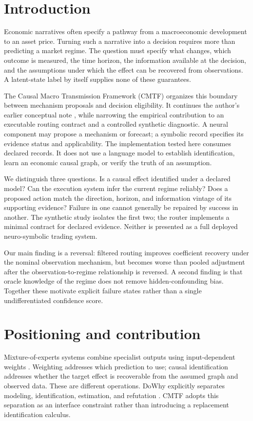 \section{Introduction}
Economic narratives often specify a pathway from a macroeconomic development to an asset price. Turning such a narrative into a decision requires more than predicting a market regime. The question must specify what changes, which outcome is measured, the time horizon, the information available at the decision, and the assumptions under which the effect can be recovered from observations. A latent-state label by itself supplies none of these guarantees.

The Causal Macro Transmission Framework (CMTF) organizes this boundary between mechanism proposals and decision eligibility. It continues the author's earlier conceptual note \citep{olapade2026agentic}, while narrowing the empirical contribution to an executable routing contract and a controlled synthetic diagnostic. A neural component may propose a mechanism or forecast; a symbolic record specifies its evidence status and applicability. The implementation tested here consumes declared records. It does not use a language model to establish identification, learn an economic causal graph, or verify the truth of an assumption.

We distinguish three questions. Is a causal effect identified under a declared model? Can the execution system infer the current regime reliably? Does a proposed action match the direction, horizon, and information vintage of its supporting evidence? Failure in one cannot generally be repaired by success in another. The synthetic study isolates the first two; the router implements a minimal contract for declared evidence. Neither is presented as a full deployed neuro-symbolic trading system.

Our main finding is a reversal: filtered routing improves coefficient recovery under the nominal observation mechanism, but becomes worse than pooled adjustment after the observation-to-regime relationship is reversed. A second finding is that oracle knowledge of the regime does not remove hidden-confounding bias. Together these motivate explicit failure states rather than a single undifferentiated confidence score.

\section{Positioning and contribution}
Mixture-of-experts systems combine specialist outputs using input-dependent weights \citep{jacobs1991}. Weighting addresses which prediction to use; causal identification addresses whether the target effect is recoverable from the assumed graph and observed data. These are different operations. DoWhy explicitly separates modeling, identification, estimation, and refutation \citep{sharma2020}. CMTF adopts this separation as an interface constraint rather than introducing a replacement identification calculus.

